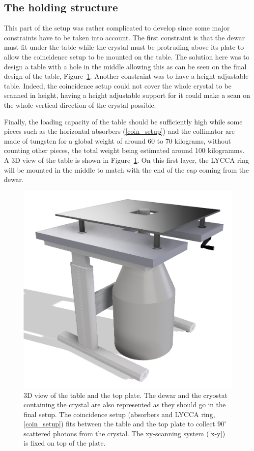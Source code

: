 \documentclass[11pt,a4paper]{article}
\begin{document}
\subsection{The holding structure}

This part of the setup was rather complicated to develop since some major constraints have to be taken into account. The first constraint is that the dewar must fit under the table while the crystal must be protruding above its plate to allow the coincidence setup to be mounted on the table. The solution here was to design a table with a hole in the middle allowing this as can be seen on the final design of the table, Figure~\ref{table}. Another constraint was to have a height adjustable table. Indeed, the coincidence setup could not cover the whole crystal to be scanned in height, having a height adjustable support for it could make a scan on the whole vertical direction of the crystal possible.

Finally, the loading capacity of the table should be sufficiently high while some pieces such as the horizontal absorbers (\ref{coin_setup}) and the collimator are made of tungsten for a global weight of around 60 to 70 kilograms, without counting other pieces, the total weight being estimated around 100 kilogramms. A 3D view of the table is shown in Figure~\ref{table}. On this first layer, the LYCCA ring will be mounted in the middle to match with the end of the cap coming from the dewar.

\begin{figure}[!h]
\centering
\includegraphics[scale=0.5]{table.png}
\caption{3D view of the table and the top plate. The dewar and the cryostat containing the crystal are also represented as they should go in the final setup. The coincidence setup (absorbers and LYCCA ring, \ref{coin_setup}) fits between the table and the top plate to collect $90^{\circ}$ scattered photons from the crystal. The xy-scanning system (\ref{x-y}) is fixed on top of the plate.}
\label{table}
\end{figure}
\end{document}
